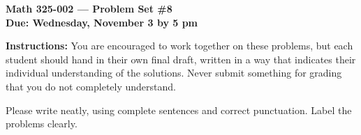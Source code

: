 \documentclass{amsart}
\begin{document}
\begin{center}
{\large\bfseries
Math 325-002 --- Problem Set \#8\\
Due: Wednesday, November 3 by 5 pm}
\end{center}





{\bf Instructions:} You are encouraged to work together on these
problems, but each student should hand in their own final draft,
written in a way that indicates their individual understanding of
the solutions. Never submit something for grading
that you do not completely understand. 

Please write neatly, using complete sentences and correct
punctuation. Label the problems clearly. 
\end{document}
